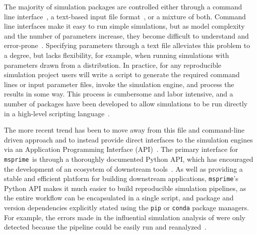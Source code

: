 \documentclass[9pt,twocolumn,twoside,lineno]{gsajnl}
\newcommand{\msprime}[0]{\texttt{msprime}}
\begin{document}
The majority of simulation packages are controlled either through
a command line interface~\citep[e.g.][]{hudson2002generating,kern2016discoal},
a text-based input file
format~\citep[e.g.][]{guillaume2006nemo,excoffier2011fastsimcoal,shlyakhter2014cosi2},
or a mixture of both.
Command line interfaces make it easy to run simple
simulations, but as model complexity and the number of parameters increase,
they become difficult to understand and
error-prone~\citep{ragsdale2020lessons,gower2021demes}.
Specifying parameters through a text file alleviates this problem to a degree,
but lacks flexibility, for example, when running simulations with parameters
drawn from a distribution. In practice, for any reproducible simulation
project users will write a script
to generate the required command lines or input parameter files,
invoke the simulation engine, and process the results in some way.
This process is cumbersome and labor intensive, and
a number of packages have been developed
to allow simulations to be run directly in a high-level
scripting language~\citep{staab2016coala,parobek2017skelesim,gladstein2018simprily}.

The more recent trend has been to move away from this file and command-line
driven approach and to instead provide direct interfaces to the simulation
engines via an Application Programming Interface (API)~\citep[e.g.][]{
thornton2014cpp,kelleher2016efficient,becheler2019quetzal,haller2019slim}.
The primary interface for \msprime\ is through a thoroughly documented
Python
API, which has encouraged the development of an ecosystem of downstream
tools~\citep{terhorst2017robust,chan2018likelihood,spence2019inference,
adrion2020community,adrion2020predicting, kamm2020efficiently,
mckenzie2020ipcoal, montinaro2020revisiting,
de2021geonomics,rivera2021simulation}.
As well as providing a stable and efficient platform for building
downstream applications, \msprime's Python API makes it much easier to
build reproducible simulation pipelines, as the entire workflow can
be encapsulated in a single script, and package and version
dependencies explicitly stated using the \texttt{pip}
or \texttt{conda} package managers.
For example, the errors made
in the influential simulation analysis of
\cite{martin2017human} were only detected because the pipeline
could be easily run and reanalyzed~\citep{ragsdale2020lessons,martin2020erratum}.
\end{document}
